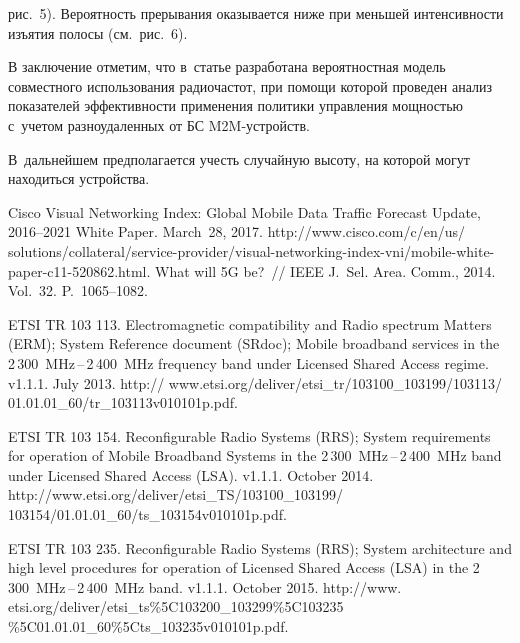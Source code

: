 \begin{multicols}{2}

\noindent
 рис.~5). Вероятность 
прерывания оказывается ниже при меньшей интенсивности изъятия полосы 
(см.\ рис.~6). 





  В заключение отметим, что в~статье разработана вероятностная модель 
совместного использования радиочастот, при помощи которой проведен анализ 
показателей эффективности применения политики управления мощ\-ностью 
с~учетом разноудаленных от БС M2M-устройств. 

В~дальнейшем 
предполагается учесть случайную высоту, на которой могут находиться 
устройства.

\vspace*{-12pt}

{\small\frenchspacing
 { %
 \begin{thebibliography}{99}
Cisco Visual Networking Index: Global Mobile Data Traffic Forecast Update, 2016--2021 White 
Paper. March~28, 2017. {\sf  
http://www.cisco.com/c/en/us/ solutions/collateral/service-provider/visual-networking-index-vni/mobile-white-paper-c11-520862.html}.
 What 
will 5G be?~// IEEE J.~Sel. Area. Comm., 2014. Vol.~32. P.~1065--1082. 

ETSI TR 103 113. Electromagnetic compatibility and Radio spectrum Matters 
(ERM); System Reference document (SRdoc); Mobile broadband services in the  
2\,300~MHz\,--\,2\,400~MHz frequency band under Licensed Shared Access regime. 
v1.1.1. July 2013. 
{\sf 
http:// www.etsi.org/deliver/etsi\_tr/103100\_103199/103113/ 01.01.01\_60/tr\_103113v010101p.pdf}.

ETSI TR 103 154. Reconfigurable Radio Systems (RRS); System requirements 
for operation of Mobile Broadband Systems in the 2\,300~MHz\,--\,2\,400~MHz band under Licensed 
Shared Access (LSA). v1.1.1. October 2014.
{\sf 
http://www.etsi.org/deliver/etsi\_TS/103100\_103199/ 103154/01.01.01\_60/ts\_103154v010101p.pdf}.

ETSI TR 103 235. Reconfigurable Radio Systems (RRS); System architecture 
and high level procedures for operation of Licensed Shared Access (LSA) in  
the 2\,300~MHz\,--\,2\,400~MHz band. v1.1.1. October 2015. {\sf 
http://www.\linebreak
 etsi.org/deliver/etsi\_ts\%5C103200\_103299\%5C103235
 \%5C01.01.01\_60\%5Cts\_103235v010101p.pdf}.


\end{thebibliography}}}
\end{multicols}
